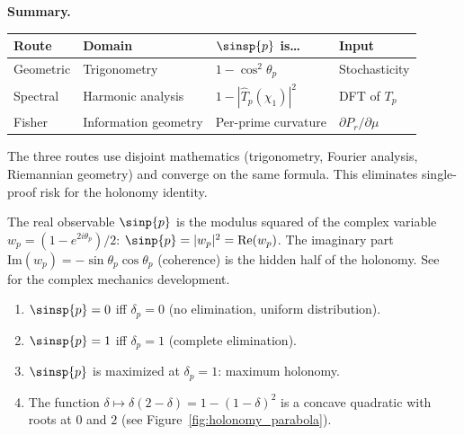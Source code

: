 \documentclass[12pt,a4paper]{article}
\begin{document}
\begin{remark}
\medskip\noindent
\textbf{Summary.}
\begin{center}
\begin{tabular}{llll}
\toprule
\textbf{Route} & \textbf{Domain} & \textbf{$\sinsp{p}$ is\ldots} & \textbf{Input} \\
\midrule
Geometric & Trigonometry & $1 - \cos^2\!\theta_p$ & Stochasticity \\
Spectral & Harmonic analysis & $1 - |\widehat{T}_p(\chi_1)|^2$ & DFT of $T_p$ \\
Fisher & Information geometry & Per-prime curvature & $\partial P_r/\partial\mu$ \\
\bottomrule
\end{tabular}
\end{center}
The three routes use disjoint mathematics (trigonometry, Fourier
analysis, Riemannian geometry) and converge on the same formula.
This eliminates single-proof risk for the holonomy identity.
\end{remark}

\begin{remark}
The real observable $\sinp{p}$ is the modulus squared of the complex
variable $w_p = (1 - e^{2i\theta_p})/2$: $\sinp{p} = |w_p|^2 = \mathrm{Re}(w_p)$.
The imaginary part $\mathrm{Im}(w_p) = -\sin\theta_p\cos\theta_p$
(coherence) is the hidden half of the holonomy.
See~\cite{companion_M4} for the complex mechanics development.
\end{remark}

\begin{remark}[Properties]
\begin{enumerate}
\item $\sinsp{p} = 0$ iff $\delta_p = 0$ (no elimination, uniform distribution).
\item $\sinsp{p} = 1$ iff $\delta_p = 1$ (complete elimination).
\item $\sinsp{p}$ is maximized at $\delta_p = 1$: maximum holonomy.
\item The function $\delta \mapsto \delta(2-\delta) = 1-(1-\delta)^2$ is
  a concave quadratic with roots at $0$ and $2$
  (see Figure~\ref{fig:holonomy_parabola}).
\end{enumerate}
\end{remark}
\end{document}
